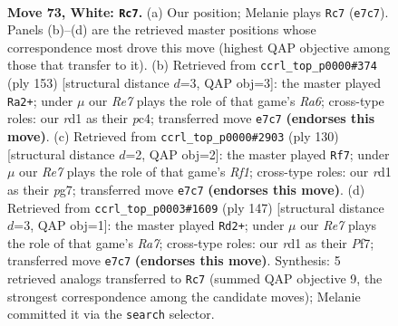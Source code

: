\documentclass[11pt]{article}
\begin{document}
\clearpage

\begin{figure}[p]\centering
\begin{subfigure}{0.46\textwidth}\centering
\resizebox{\linewidth}{!}{%
\newchessgame
\chessboard[
  setfen={8/4R3/1r5k/8/5K2/8/7P/3r4 w - - 13 73},
  showmover=false,
  pgfstyle=straightmove, color=movearrow, markmove={e7-c7}
]}
\caption{}
\end{subfigure}\hfill
\begin{subfigure}{0.46\textwidth}\centering
\resizebox{\linewidth}{!}{%
\newchessgame
\chessboard[
  setfen={8/4R3/8/2p4k/2P5/r7/4K3/8 b - - 11 77},
  showmover=false,
  pgfstyle=straightmove, color=movearrow, markmove={a3-a2}
]}
\caption{}
\end{subfigure}
\\[4pt]
\begin{subfigure}{0.46\textwidth}\centering
\resizebox{\linewidth}{!}{%
\newchessgame
\chessboard[
  setfen={8/6p1/r2k4/8/2K5/8/6P1/5R2 w - - 0 66},
  showmover=false,
  pgfstyle=straightmove, color=movearrow, markmove={f1-f7}
]}
\caption{}
\end{subfigure}\hfill
\begin{subfigure}{0.46\textwidth}\centering
\resizebox{\linewidth}{!}{%
\newchessgame
\chessboard[
  setfen={8/5p2/8/1R1K4/5k2/2P5/r7/8 b - - 0 74},
  showmover=false,
  pgfstyle=straightmove, color=movearrow, markmove={a2-d2}
]}
\caption{}
\end{subfigure}
\caption{\textbf{Move 73, White: \texttt{Rc7}.} (a) Our position; Melanie plays \texttt{Rc7} (\texttt{e7c7}). Panels (b)--(d) are the retrieved master positions whose correspondence most drove this move (highest QAP objective among those that transfer to it). (b) Retrieved from \texttt{ccrl\_top\_p0000\#374} (ply 153) [structural distance $d$=3, QAP obj=3]: the master played \texttt{Ra2+}; under $\mu$ our \emph{Re7} plays the role of that game's \emph{Ra6}; cross-type roles: our \emph{r}d1 as their \emph{p}c4; transferred move \texttt{e7c7} \textbf{(endorses this move)}. (c) Retrieved from \texttt{ccrl\_top\_p0000\#2903} (ply 130) [structural distance $d$=2, QAP obj=2]: the master played \texttt{Rf7}; under $\mu$ our \emph{Re7} plays the role of that game's \emph{Rf1}; cross-type roles: our \emph{r}d1 as their \emph{p}g7; transferred move \texttt{e7c7} \textbf{(endorses this move)}. (d) Retrieved from \texttt{ccrl\_top\_p0003\#1609} (ply 147) [structural distance $d$=3, QAP obj=1]: the master played \texttt{Rd2+}; under $\mu$ our \emph{Re7} plays the role of that game's \emph{Ra7}; cross-type roles: our \emph{r}d1 as their \emph{P}f7; transferred move \texttt{e7c7} \textbf{(endorses this move)}. Synthesis: 5 retrieved analogs transferred to \texttt{Rc7} (summed QAP objective 9, the strongest correspondence among the candidate moves); Melanie committed it via the \texttt{search} selector.}
\label{fig:thought-m144}
\end{figure}
\end{document}
